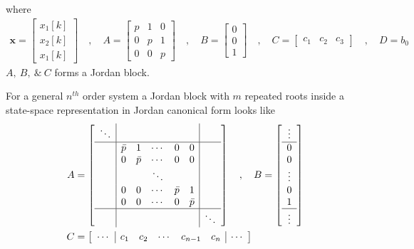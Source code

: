 \documentclass[twoside]{article}
\begin{document}
%
where 
%
\begin{align*}
\mathbf{x} = \left[ \begin{array}{c} x_1[k] \\ x_2[k] \\
x_1[k] \end{array} \right] \quad , \quad
A = \left[ \begin{array}{ccc} p & 1 & 0 \\ 0 & p & 1
    \\ 0 & 0 & p \end{array} \right]
\quad , \quad 
B = \left[ \begin{array}{c} 0 \\ 0
    \\ 1 \end{array} \right]
\quad , \quad
C = \left[ \begin{array}{ccc} c_1 & c_2 & c_3 \end{array} \right]
\quad , \quad
D = b_0
\end{align*}
%
$A, \ B, \ \& \ C$ forms a Jordan block. 

For a general $n^{th}$ order system a Jordan block 
with $m$ repeated roots inside a state-space representation
in Jordan canonical form looks like
%
\begin{align*}
A &= \left[ \begin{array}{c|ccccc|c} 
\ddots & & & & & &
\\ \hline
& \bar{p} & 1 & \cdots & 0 & 0 & 
\\ & 0 & \bar{p} & \cdots & 0 & 0
\\ & & & \ddots & & & 
\\ & 0 & 0 & \cdots & \bar{p} & 1
    \\ & 0 & 0 & \cdots & 0 & \bar{p}
\\
\hline
& & & & & & \ddots
 \end{array} \right]
\quad , \quad 
B = \left[ \begin{array}{c} \vdots \\\hline 
0 \\ 0 \\ \vdots \\ 0 \\  1 \\ \hline
\vdots
\end{array} \right]
\\ C &= \left[ \begin{array}{c|ccccc|c} \cdots & 
c_1 & c_2 & \cdots &  c_{n-1} & c_n & \cdots\end{array} \right]
\end{align*}
%
\end{document}
